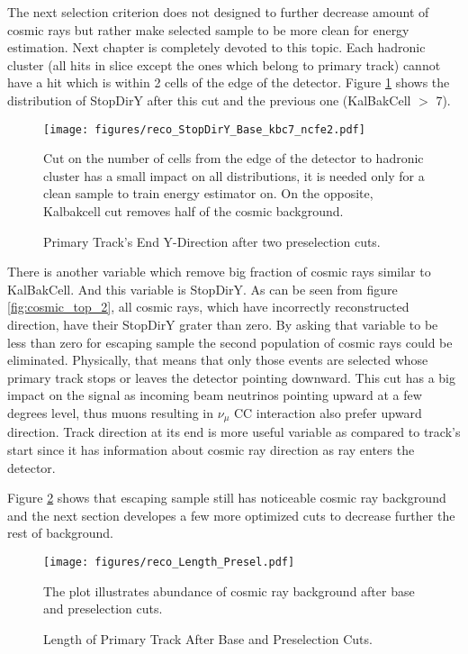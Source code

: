 The next selection criterion does not designed to further decrease amount of cosmic rays but rather make selected sample 
to be more clean for energy estimation. Next chapter is completely devoted to this topic. Each
hadronic cluster (all hits in slice except the ones which belong to primary track) cannot have a hit which is within
2 cells of the edge of the detector. Figure \ref{fig:stopdiry_2} shows the
distribution of StopDirY after this cut and the previous one (KalBakCell $>$ 7).
\begin{figure}[h]
\centering
\texttt{[image: figures/reco\_StopDirY\_Base\_kbc7\_ncfe2.pdf]}
\caption{Primary Track's End Y-Direction after two preselection cuts.}
{Cut on the number of cells from the edge of the detector to hadronic cluster has a small impact on all distributions, 
it is needed only for a clean sample to train energy estimator on. On the opposite, Kalbakcell cut removes half of 
the cosmic background. }
\label{fig:stopdiry_2}
\end{figure} 

There is another variable which remove big fraction of cosmic rays similar to KalBakCell. And this variable 
is StopDirY. As can be seen from figure \ref{fig:cosmic_top_2}, all cosmic rays, which have incorrectly reconstructed
direction, have their StopDirY grater than zero. By asking that variable to be less than zero for escaping 
sample the second population of cosmic rays could be eliminated. Physically, that means that only those events
are selected whose primary track stops or leaves the detector pointing downward. This cut has a big impact
on the signal as incoming beam neutrinos pointing upward at a few degrees level, thus muons resulting in $\nu_\mu$
CC interaction also prefer upward direction. Track direction at its end is more useful variable as compared to
track's start since it has information about cosmic ray direction as ray enters the detector. 

Figure \ref{fig:length_2} shows that escaping sample still has noticeable cosmic ray background and the next 
section developes a few more optimized cuts to decrease further the rest of background.

\begin{figure}[!h]
\centering
\texttt{[image: figures/reco\_Length\_Presel.pdf]}
\caption{Length of Primary Track After Base and Preselection Cuts.}
{The plot illustrates abundance of cosmic ray background after base and preselection cuts. }
\label{fig:length_2}
\end{figure}

